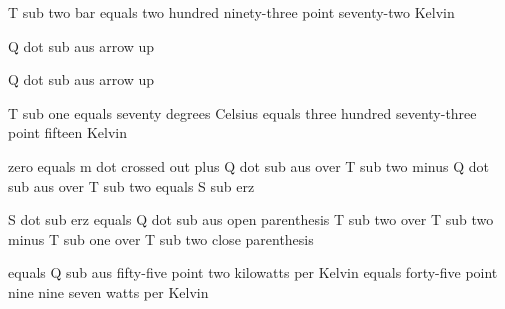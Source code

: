 T sub two bar equals two hundred ninety-three point seventy-two Kelvin

Q dot sub aus arrow up

Q dot sub aus arrow up

T sub one equals seventy degrees Celsius equals three hundred seventy-three point fifteen Kelvin

zero equals m dot crossed out plus Q dot sub aus over T sub two minus Q dot sub aus over T sub two equals S sub erz

S dot sub erz equals Q dot sub aus open parenthesis T sub two over T sub two minus T sub one over T sub two close parenthesis

equals Q sub aus fifty-five point two kilowatts per Kelvin equals forty-five point nine nine seven watts per Kelvin